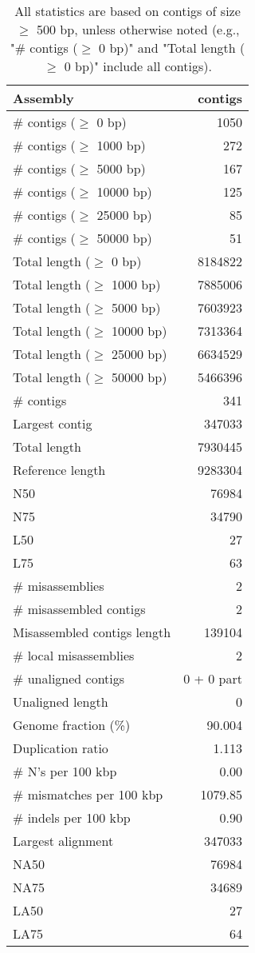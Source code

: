 \documentclass[12pt,a4paper]{article}
\begin{document}
\begin{table}[ht]
\begin{center}
\caption{All statistics are based on contigs of size $\geq$ 500 bp, unless otherwise noted (e.g., "\# contigs ($\geq$ 0 bp)" and "Total length ($\geq$ 0 bp)" include all contigs).}
\begin{tabular}{|l*{1}{|r}|}
\hline
Assembly & contigs \\ \hline
\# contigs ($\geq$ 0 bp) & 1050 \\ \hline
\# contigs ($\geq$ 1000 bp) & 272 \\ \hline
\# contigs ($\geq$ 5000 bp) & 167 \\ \hline
\# contigs ($\geq$ 10000 bp) & 125 \\ \hline
\# contigs ($\geq$ 25000 bp) & 85 \\ \hline
\# contigs ($\geq$ 50000 bp) & 51 \\ \hline
Total length ($\geq$ 0 bp) & 8184822 \\ \hline
Total length ($\geq$ 1000 bp) & 7885006 \\ \hline
Total length ($\geq$ 5000 bp) & 7603923 \\ \hline
Total length ($\geq$ 10000 bp) & 7313364 \\ \hline
Total length ($\geq$ 25000 bp) & 6634529 \\ \hline
Total length ($\geq$ 50000 bp) & 5466396 \\ \hline
\# contigs & 341 \\ \hline
Largest contig & 347033 \\ \hline
Total length & 7930445 \\ \hline
Reference length & 9283304 \\ \hline
N50 & 76984 \\ \hline
N75 & 34790 \\ \hline
L50 & 27 \\ \hline
L75 & 63 \\ \hline
\# misassemblies & 2 \\ \hline
\# misassembled contigs & 2 \\ \hline
Misassembled contigs length & 139104 \\ \hline
\# local misassemblies & 2 \\ \hline
\# unaligned contigs & 0 + 0 part \\ \hline
Unaligned length & 0 \\ \hline
Genome fraction (\%) & 90.004 \\ \hline
Duplication ratio & 1.113 \\ \hline
\# N's per 100 kbp & 0.00 \\ \hline
\# mismatches per 100 kbp & 1079.85 \\ \hline
\# indels per 100 kbp & 0.90 \\ \hline
Largest alignment & 347033 \\ \hline
NA50 & 76984 \\ \hline
NA75 & 34689 \\ \hline
LA50 & 27 \\ \hline
LA75 & 64 \\ \hline
\end{tabular}
\end{center}
\end{table}
\end{document}
